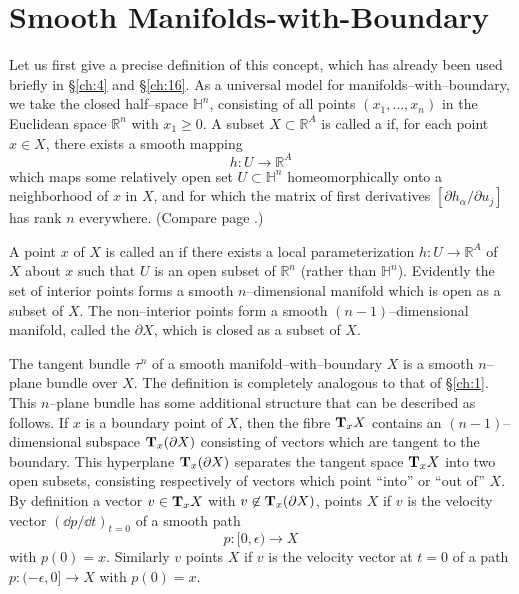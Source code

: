 \documentclass[../main]{subfiles}
\begin{document}
\section{Smooth Manifolds-with-Boundary}
Let us first give a precise definition of this concept, which has already been used briefly in \S\ref{ch:4} and \S\ref{ch:16}. As a universal model for manifolds--with--boundary, we take the closed half--space ${\mathbb H}^n$, consisting of all points $(x_1, \ldots, x_n)$ in the Euclidean space ${\mathbb R}^n$ with $x_1 \ge 0$. A subset $X \subset {\mathbb R}^A$ is called a  if, for each point $x \in X$, there exists a smooth mapping \[h : U \longrightarrow {\mathbb R}^A\] which maps some relatively open set $U \subset {\mathbb H}^n$ homeomorphically onto a neighborhood of $x$ in $X$, and for which the matrix of first derivatives $[\partial h_\alpha/\partial u_j]$ has rank $n$ everywhere. (Compare page \pageref{lem:1.1}.)

A point $x$ of $X$ is called an  if there exists a local parameterization $h : U \longrightarrow {\mathbb R}^A$ of $X$ about $x$ such that $U$ is an open subset of ${\mathbb R}^n$ (rather than ${\mathbb H}^n$). Evidently the set of interior points forms a smooth $n$--dimensional manifold which is open as a subset of $X$. The non--interior points form a smooth $(n - 1)$--dimensional manifold, called the  $\partial X$, which is closed as a subset of $X$. 

The tangent bundle $\tau^n$ of a smooth manifold--with--boundary $X$ is a smooth $n$--plane bundle over $X$. The definition is completely analogous to that of \S \ref{ch:1}. This $n$--plane bundle has some additional structure that can be described as follows. If $x$ is a boundary point of $X$, then the fibre $\tangentspace X x$ contains an $(n - 1)$--dimensional subspace $\tangentspace {(\partial X)} x$ consisting of vectors which are tangent to the boundary. This hyperplane $\tangentspace {(\partial X)} x$ separates the tangent space $\tangentspace X x$ into two open subsets, consisting respectively of vectors which point ``into'' or ``out of'' $X$. By definition a vector $v \in \tangentspace X x$ with $v \not \in \tangentspace {(\partial X)} x$, points  $X$ if $v$ is the velocity vector $(\dd p/\dd t)_{t = 0}$ of a smooth path \[p : [0, \epsilon) \longrightarrow X\] with $p(0) = x$. Similarly $v$ points  $X$ if $v$ is the velocity vector at $t = 0$ of a path $p : (-\epsilon, 0] \longrightarrow X$ with $p(0) = x$.  
\end{document}
